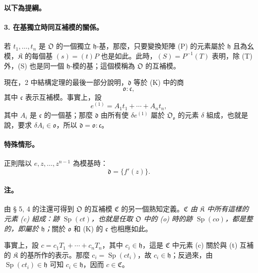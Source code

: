 \documentclass[11pt]{article}
\begin{document}
\begin{center}
\textbf{以下為提綱。}
\end{center}

\paragraph{3. 在基獨立時同互補模的關係。}
若 \(t_1,\ldots,t_n\) 是 \(\mathfrak O\) 的一個獨立 \(\mathfrak h\)-基，那麼，只要變換矩陣 (P) 的元素屬於 \(\mathfrak h\) 且為幺模，\(\mathfrak K\) 的每個基 \((s)=(t)P\) 也是如此。此時，\((S)=P^{-1}(T)\) 表明，除 (T) 外，(S) 也是同一個 \(\mathfrak h\)-模的基；這個模稱為 \(\mathfrak O\) 的互補模。

現在，2 中結構定理的最後一部分說明，\(\mathfrak d\) 等於 (K) 中的商
\[
\mathfrak o:\mathfrak c,
\]
其中 \(\mathfrak c\) 表示互補模。事實上，設
\[
e^{(1)}=A_1t_1+\cdots+A_nt_n,
\]
其中 \(A_i\) 是 \(\mathfrak c\) 的一個基；那麼 \(\mathfrak d\) 由所有使 \(\delta e^{(1)}\) 屬於 \(\mathfrak O_{\mathfrak o}\) 的元素 \(\delta\) 組成，也就是說，要求 \(\delta A_i\in\mathfrak o\)，所以 \(\mathfrak d=\mathfrak o:\mathfrak c\)。

\paragraph{特殊情形。}
正則階以 \(e,z,\ldots,z^{n-1}\) 為模基時：
\[
\mathfrak d=\{f'(z)\}.
\]

\paragraph{注。}
由 § 5, 4 的注還可得到 \(\mathfrak O\) 的互補模 \(\mathfrak C\) 的另一個熟知定義。\emph{\(\mathfrak C\) 由 \(\mathfrak K\) 中所有這樣的元素 (c) 組成：跡 \(\operatorname{Sp}(ct)\)，也就是任取 \(\mathfrak O\) 中的 (o) 時的跡 \(\operatorname{Sp}(co)\)，都是整的，即屬於 \(\mathfrak h\)；}關於 \(\mathfrak o\) 和 (K) 的 \(\mathfrak c\) 也相應如此。

事實上，設 \(c=c_1T_1+\cdots+c_nT_n\)，其中 \(c_i\in\mathfrak h\)，這是 \(\mathfrak C\) 中元素 (c) 關於與 (t) 互補的 \(\mathfrak K\) 的基所作的表示。那麼 \(c_i=\operatorname{Sp}(ct_i)\)，故 \(c_i\in\mathfrak h\)；反過來，由 \(\operatorname{Sp}(ct_i)\in\mathfrak h\) 可知 \(c_i\in\mathfrak h\)，因而 \(c\in\mathfrak C\)。
\end{document}
